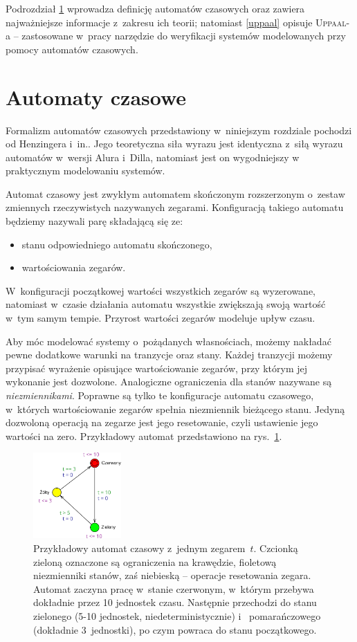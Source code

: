 \documentclass{pracamgr}
\newcommand{\imgr}[1]{rys.~\ref{#1}}
\newcommand{\upp}{\textsc{Uppaal}}
\theoremstyle{plain}
\begin{document}
Podrozdział \ref{ta-theory} wprowadza definicję automatów czasowych
oraz zawiera najważniejsze informacje z~zakresu ich teorii;
natomiast \ref{uppaal} opisuje \upp-a -- zastosowane w~pracy narzędzie
do weryfikacji systemów modelowanych przy pomocy automatów czasowych.

\section{Automaty czasowe}
\label{ta-theory}

Formalizm automatów czasowych przedstawiony w~niniejszym
rozdziale pochodzi od  Henzingera i~in.\cite{henz-94}. Jego teoretyczna
siła wyrazu jest identyczna z~siłą wyrazu automatów w~wersji Alura
i~Dilla, natomiast jest on wygodniejszy w praktycznym modelowaniu
systemów.

Automat czasowy jest zwykłym automatem skończonym rozszerzonym
o~zestaw zmiennych rzeczywistych nazywanych zegarami. Konfiguracją
takiego automatu będziemy nazywali parę składającą się ze:
\begin{itemize}
  \item stanu odpowiedniego automatu skończonego,
  \item wartościowania zegarów.
\end{itemize}
W~konfiguracji początkowej wartości wszystkich zegarów są wyzerowane,
natomiast w~czasie działania automatu wszystkie zwiększają swoją wartość
w~tym samym tempie. Przyrost wartości zegarów modeluje upływ czasu.

Aby móc modelować systemy o~pożądanych własnościach, możemy nakładać
pewne dodatkowe warunki na tranzycje oraz stany. Każdej
tranzycji możemy przypisać wyrażenie opisujące wartościowanie zegarów,
przy którym jej wykonanie jest dozwolone. Analogiczne ograniczenia dla
stanów nazywane są \emph{niezmiennikami}. Poprawne są tylko te
konfiguracje automatu czasowego, w~których wartościowanie zegarów spełnia
niezmiennik bieżącego stanu. Jedyną dozwoloną operacją na zegarze
jest jego resetowanie, czyli ustawienie jego wartości na
zero. Przykładowy automat przedstawiono na \imgr{img:ta-simple}.

\begin{figure}
  \centering
  \includegraphics[width=0.3\textwidth]{img/ta-simple}
  \caption {Przykładowy automat czasowy z~jednym zegarem~$t$.
    Czcionką zieloną oznaczone są ograniczenia na krawędzie, fioletową
    niezmienniki stanów, zaś niebieską -- operacje resetowania
    zegara.\\ Automat zaczyna pracę w~stanie czerwonym, w~którym
    przebywa dokładnie przez 10 jednostek czasu. Następnie przechodzi
    do stanu zielonego (5-10 jednostek, niedeterministycznie)
i~    pomarańczowego (dokładnie 3~jednostki), po czym powraca do stanu
    początkowego.}
  \label{img:ta-simple}
\end{figure}
\end{document}
